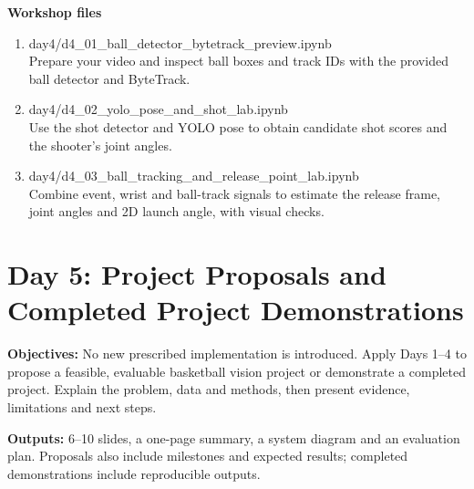 \documentclass[11pt,a4paper]{article}
\newenvironment{projectfiles}{
  \vspace{2.5mm}
  \begin{tcolorbox}[colback=SoftGray,colframe=DarkGray,arc=1.5mm,boxrule=0.45pt,left=2.5mm,right=2.5mm,top=2mm,bottom=1.5mm,breakable]
    {\normalsize\bfseries Workshop files}\\[-0.2mm]
    \begin{enumerate}[leftmargin=1.7em,itemsep=2pt,topsep=2pt,parsep=0pt]
      }{
    \end{enumerate}
  \end{tcolorbox}
}
\newcommand{\daybox}[2]{%
  \begin{tcolorbox}[colback=SoftGray,colframe=DarkGray,arc=1mm,boxrule=0.45pt,left=2.5mm,right=2.5mm,top=2mm,bottom=2mm]
    \textbf{Objectives:} #1

    \vspace{1mm}
    \textbf{Outputs:} #2
  \end{tcolorbox}
}
\newcommand{\projectfile}[2]{\item {\ttfamily\small #1}\\[-0.3mm]{\footnotesize #2}}
\begin{document}
\normalsize
\vspace{3mm}
\begin{projectfiles}
\projectfile{day4/d4\_01\_ball\_detector\_bytetrack\_preview.ipynb}{Prepare your video and inspect ball boxes and track IDs with the provided ball detector and ByteTrack.}
\projectfile{day4/d4\_02\_yolo\_pose\_and\_shot\_lab.ipynb}{Use the shot detector and YOLO pose to obtain candidate shot scores and the shooter's joint angles.}
\projectfile{day4/d4\_03\_ball\_tracking\_and\_release\_point\_lab.ipynb}{Combine event, wrist and ball-track signals to estimate the release frame, joint angles and 2D launch angle, with visual checks.}
\end{projectfiles}

\clearpage
\section{Day 5: Project Proposals and Completed Project Demonstrations}
\daybox{No new prescribed implementation is introduced. Apply Days 1--4 to propose a feasible, evaluable basketball vision project or demonstrate a completed project. Explain the problem, data and methods, then present evidence, limitations and next steps.}{6--10 slides, a one-page summary, a system diagram and an evaluation plan. Proposals also include milestones and expected results; completed demonstrations include reproducible outputs.}
\end{document}
